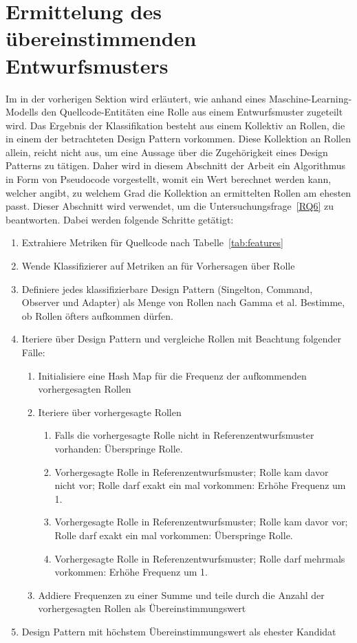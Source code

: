 \section{Ermittelung des übereinstimmenden Entwurfsmusters}\label{pattern}

Im in der vorherigen Sektion wird erläutert, wie anhand eines Maschine-Learning-Modells den Quellcode-Entitäten eine Rolle aus einem Entwurfsmuster zugeteilt wird.
Das Ergebnis der Klassifikation besteht aus einem Kollektiv an Rollen, die in einem der betrachteten Design Pattern vorkommen. Diese Kollektion an Rollen allein, reicht nicht aus, um eine Aussage über die Zugehörigkeit eines Design Patterns zu tätigen.
Daher wird in diesem Abschnitt der Arbeit ein Algorithmus in Form von Pseudocode vorgestellt, womit ein Wert berechnet werden kann, welcher angibt, zu welchem Grad die Kollektion an ermittelten Rollen am ehesten passt.
Dieser Abschnitt wird verwendet, um die Untersuchungsfrage~\ref{RQ6} zu beantworten. Dabei werden folgende Schritte getätigt:

\begin{enumerate}
    \item Extrahiere Metriken für Quellcode nach Tabelle~\ref{tab:features}
    \item Wende Klassifizierer auf Metriken an für Vorhersagen über Rolle
    \item Definiere jedes klassifizierbare Design Pattern (Singelton, Command, Observer und Adapter) als Menge von Rollen nach Gamma et al. Bestimme, ob Rollen öfters aufkommen dürfen.
    \item Iteriere über Design Pattern und vergleiche Rollen mit Beachtung folgender Fälle:
        \begin{enumerate}
            \item Initialisiere eine Hash Map für die Frequenz der aufkommenden vorhergesagten Rollen
            \item Iteriere über vorhergesagte Rollen
            \begin{enumerate}
                \item Falls die vorhergesagte Rolle nicht in Referenzentwurfsmuster vorhanden: Überspringe Rolle.
                \item Vorhergesagte Rolle in Referenzentwurfsmuster; Rolle kam davor nicht vor; Rolle darf exakt ein mal vorkommen: Erhöhe Frequenz um 1.
                \item Vorhergesagte Rolle in Referenzentwurfsmuster; Rolle kam davor vor; Rolle darf exakt ein mal vorkommen: Überspringe Rolle.
                \item Vorhergesagte Rolle in Referenzentwurfsmuster; Rolle darf mehrmals vorkommen: Erhöhe Frequenz um 1.
            \end{enumerate}
            \item Addiere Frequenzen zu einer Summe und teile durch die Anzahl der vorhergesagten Rollen als Übereinstimmungswert
        \end{enumerate}    
     \item Design Pattern mit höchstem Übereinstimmungswert als ehester Kandidat
\end{enumerate}